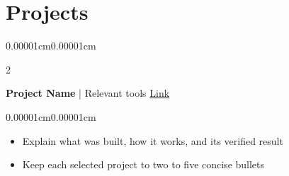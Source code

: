 \documentclass[10pt,letterpaper]{article}
\newenvironment{highlights}{
  \begin{itemize}[topsep=0.02cm,parsep=0.02cm,partopsep=0pt,itemsep=0pt,leftmargin=10pt]
}{\end{itemize}}
\newenvironment{onecolentry}{\begin{adjustwidth}{0.00001cm}{0.00001cm}}{\end{adjustwidth}}
\newenvironment{projectentry}[2][]{
  \onecolentry\def\secondColumn{#2}\setcolumnwidth{\fill,1.6cm}\begin{paracol}{2}
}{\switchcolumn\raggedleft\secondColumn\end{paracol}\endonecolentry}
\let\hrefWithoutArrow\href
\begin{document}
  \section{Projects}
  \begin{projectentry}{\hrefWithoutArrow{https://example.com}{Link}}
    \textbf{Project Name} | Relevant tools
  \end{projectentry}
  \begin{onecolentry}
    \begin{highlights}
      \item Explain what was built, how it works, and its verified result
      \item Keep each selected project to two to five concise bullets
    \end{highlights}
  \end{onecolentry}

\end{document}
